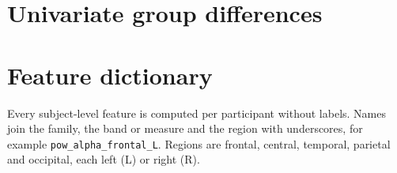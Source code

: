\section{Univariate group differences}
\begin{table}[h]
\centering\small
\caption{The ten features with the smallest uncorrected Mann--Whitney $p$ (MDD vs.\ HC, included participants).
$p_\text{FDR}$ is Benjamini--Hochberg corrected over all 288 features.}
\label{tab:uni}

\end{table}

\section{Feature dictionary}\label{app:dictionary}
Every subject-level feature is computed per participant without labels. Names join the family, the band or measure and the region with underscores, for example
\texttt{pow\_alpha\_frontal\_L}. Regions are frontal, central, temporal, parietal and occipital, each
left (L) or right (R).

